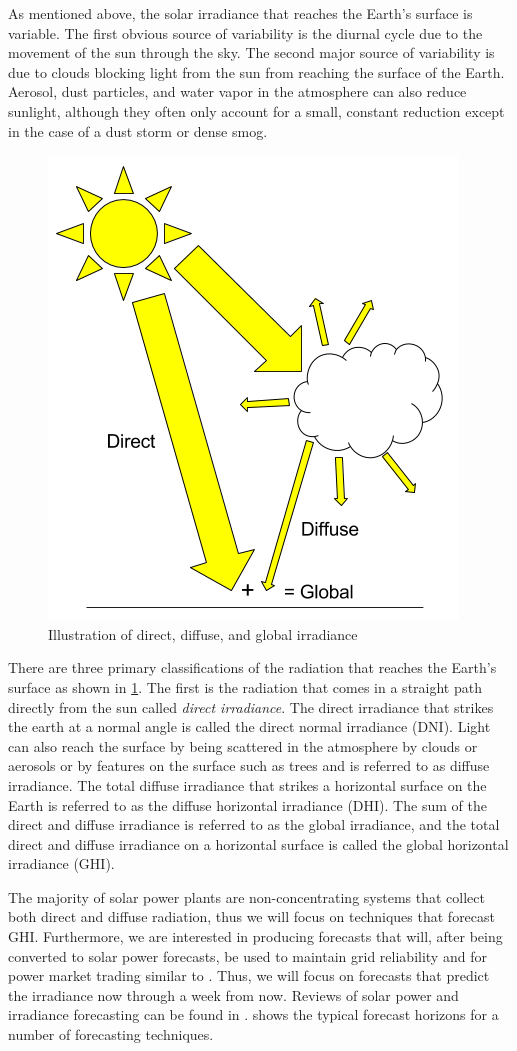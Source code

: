 As mentioned above, the solar irradiance that reaches the Earth's
surface is variable.
The first obvious source of variability is the diurnal cycle due to
the movement of the sun through the sky.
The second major source of variability is due to clouds blocking light
from the sun from reaching the surface of the Earth.
Aerosol, dust particles, and water vapor in the atmosphere can also
reduce sunlight, although they often only account for a small, constant
reduction except in the case of a dust storm or dense smog.

\begin{figure}[htb]
\centering
\includegraphics[width=.5\textwidth]{figs/comp_of_irr.png}
\caption{Illustration of direct, diffuse, and global irradiance}
\label{fig:irradiance_components}
\end{figure}

There are three primary classifications of the radiation that reaches
the Earth's surface as shown in \cref{fig:irradiance_components}.
The first is the radiation that comes in a straight path directly from
the sun called {\em direct irradiance}.
The direct irradiance that strikes the earth at a normal angle is
called the direct normal irradiance (DNI).
Light can also reach the surface by being scattered in the atmosphere
by clouds or aerosols or by features on the surface such as trees and
is referred to as diffuse irradiance.
The total diffuse irradiance that strikes a horizontal surface on the
Earth is referred to as the diffuse horizontal irradiance (DHI).
The sum of the direct and diffuse irradiance is referred to as the
global irradiance, and the total direct and diffuse irradiance on a
horizontal surface is called the global horizontal irradiance (GHI).

The majority of solar power plants are non-concentrating systems that
collect both direct and diffuse radiation, thus we will focus on
techniques that forecast GHI.
Furthermore, we are interested in producing forecasts that will,
after being converted to solar power forecasts, be used to maintain
grid reliability and for power market trading similar to
\cite{Kaur2016}.
Thus, we will focus on forecasts that predict the irradiance now
through a week from now.
Reviews of solar power and irradiance forecasting can be found in
\citep{Inman2013,Antonanzas2016,Kleissl2013}.
 shows the typical forecast horizons for a number of
forecasting techniques.


